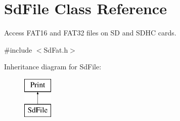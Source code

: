 \hypertarget{class_sd_file}{}\section{Sd\+File Class Reference}
\label{class_sd_file}


Access F\+A\+T16 and F\+A\+T32 files on S\+D and S\+D\+H\+C cards.  




{\ttfamily \#include $<$Sd\+Fat.\+h$>$}

Inheritance diagram for Sd\+File\+:\begin{figure}[H]
\begin{center}
\leavevmode
\includegraphics[height=2.000000cm]{class_sd_file}
\end{center}
\end{figure}
